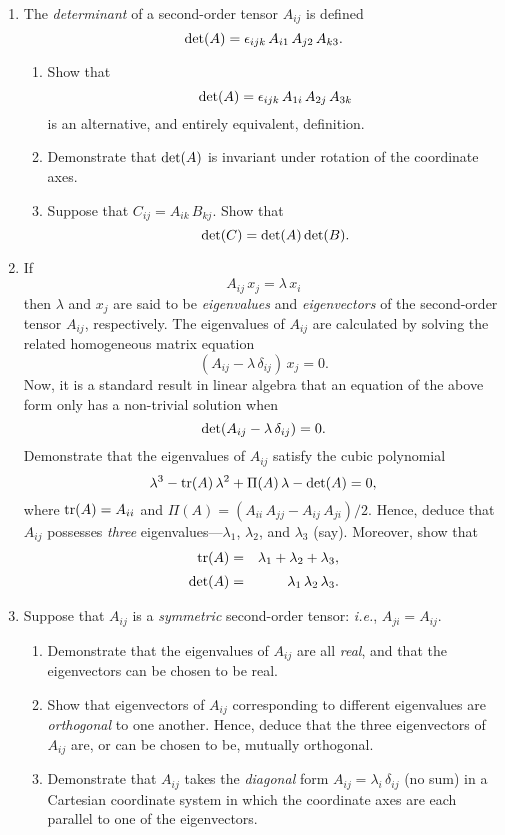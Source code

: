 {\begin{enumerate}
\item The {\em determinant}\/ of a second-order tensor $A_{ij}$ is defined 
$$
{\rm det}(A) = \epsilon_{ijk}\,A_{i1}\,A_{j2}\,A_{k3}.
$$
\begin{enumerate}
\item Show that 
$$
{\rm det}(A) = \epsilon_{ijk}\,A_{1i}\,A_{2j}\,A_{3k}
$$
is an alternative, and entirely equivalent, definition.
\item Demonstrate that ${\rm det}(A)$ is invariant under rotation of the coordinate axes.
\item Suppose that $C_{ij} = A_{ik}\,B_{kj}$. Show that
$$
{\rm det}(C) = {\rm det}(A)\,{\rm det}(B).
$$
\end{enumerate}

\item If
$$
A_{ij}\,x_j = \lambda\,x_i
$$
then $\lambda$ and $x_j$ are said to be  {\em eigenvalues}\/ and {\em eigenvectors}\/ of the second-order  tensor $A_{ij}$, respectively.
The eigenvalues of $A_{ij}$ are calculated by solving the related homogeneous matrix equation
$$
(A_{ij}-\lambda\,\delta_{ij})\,x_j = 0.
$$
Now, it is a standard result in linear algebra that an equation of the  above form  only has a non-trivial
solution when 
$$
{\rm det}(A_{ij}-\lambda\,\delta_{ij}) = 0.
$$
Demonstrate that the eigenvalues of $A_{ij}$ satisfy the cubic polynomial
$$
\lambda^3 - {\rm tr}(A) \,\lambda^2 + \Pi(A)\,\lambda - {\rm det}(A) = 0,
$$
where
${\rm tr}(A) = A_{ii}$ and $\Pi(A)= (A_{ii}\,A_{jj}-A_{ij}\,A_{ji})/2$. 
Hence, deduce that $A_{ij}$ possesses {\em three}\/ eigenvalues---$\lambda_1$, $\lambda_2$, and $\lambda_3$ (say).
Moreover, show that
\begin{eqnarray}
{\rm tr}(A) &=&\lambda_1+\lambda_2+\lambda_3,\nonumber\\[0.5ex]
{\rm det}(A)&=&\lambda_1\,\lambda_2\,\lambda_3.\nonumber
\end{eqnarray}

\item Suppose that $A_{ij}$ is a {\em symmetric}\/ second-order tensor: {\em i.e.}, $A_{ji}=A_{ij}$. 
\begin{enumerate}
\item Demonstrate that the eigenvalues of $A_{ij}$ are all {\em real}, and that the eigenvectors
can be chosen to be real. 
\item Show that eigenvectors of $A_{ij}$ corresponding to different eigenvalues
are {\em orthogonal}\/ to one another. Hence, deduce that the three eigenvectors of $A_{ij}$ are, or can be chosen to be, mutually orthogonal. 
\item Demonstrate that $A_{ij}$ takes the {\em diagonal}\/ form $A_{ij}=\lambda_i\,\delta_{ij}$ (no sum) in a
Cartesian coordinate system in which the coordinate axes are each parallel to one of the eigenvectors. 
\end{enumerate}


\end{enumerate}}
